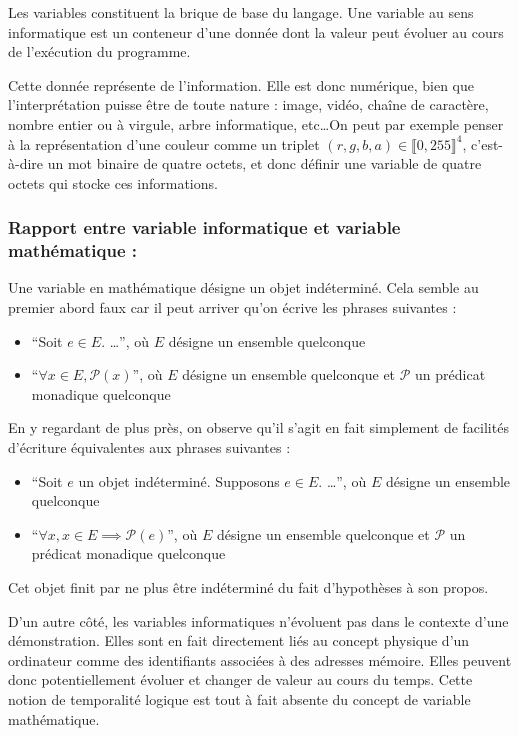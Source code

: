 \documentclass[../../../main.tex]{subfiles}
\begin{document}
Les variables constituent la brique de base du langage. Une variable au sens informatique est un conteneur d'une donnée dont la valeur peut évoluer au cours de l'exécution du programme.
 
Cette donnée représente de l'information. Elle est donc numérique, bien que l'interprétation puisse être de toute nature : image, vidéo, chaîne de caractère, nombre entier ou à virgule, arbre informatique, etc\dots On peut par exemple penser à la représentation d'une couleur comme un triplet $(r, g, b, a)\in{\llbracket 0, 255\rrbracket^{4}}$, c'est-à-dire un mot binaire de quatre octets, et donc définir une variable de quatre octets qui stocke ces informations.
 
\subsubsection{Rapport entre variable informatique et variable mathématique :}
 
Une variable en mathématique désigne un objet indéterminé. Cela semble au premier abord faux car il peut arriver qu'on écrive les phrases suivantes :
\begin{itemize}
	\item ``Soit $e\in{E}$. \dots'', où $E$ désigne un ensemble quelconque
	\item ``$\forall{x\in{E}}, \mathcal{P}(x)$'', où $E$ désigne un ensemble quelconque et $\mathcal{P}$ un prédicat monadique quelconque
\end{itemize}
En y regardant de plus près, on observe qu'il s'agit en fait simplement de facilités d'écriture équivalentes aux phrases suivantes :
\begin{itemize}
	\item ``Soit $e$ un objet indéterminé. Supposons $e\in{E}$. \dots'', où $E$ désigne un ensemble quelconque
	\item ``$\forall{x}, x\in{E}\implies{\mathcal{P}(e)}$'', où $E$ désigne un ensemble quelconque et $\mathcal{P}$ un prédicat monadique quelconque
\end{itemize}
Cet objet finit par ne plus être indéterminé du fait d'hypothèses à son propos.
 
D'un autre côté, les variables informatiques n'évoluent pas dans le contexte d'une démonstration. Elles sont en fait directement liés au concept physique d'un ordinateur comme des identifiants associées à des adresses mémoire. Elles peuvent donc potentiellement évoluer et changer de valeur au cours du temps. Cette notion de temporalité logique est tout à fait absente du concept de variable mathématique.
 
\end{document}
